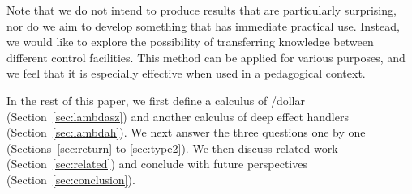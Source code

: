 Note that we do not intend to produce results that are particularly 
surprising, nor do we aim to develop something that has immediate 
practical use.
Instead, we would like to explore the possibility of transferring 
knowledge between different control facilities.
This method can be applied for various purposes, and we feel that it is 
especially effective when used in a pedagogical context.

In the rest of this paper, we first define a calculus of \shiftztt/dollar
(Section~\ref{sec:lambdasz}) and another calculus of deep effect handlers
(Section~\ref{sec:lambdah}).
We next answer the three questions one by one (Sections~\ref{sec:return} to
\ref{sec:type2}).
We then discuss related work (Section~\ref{sec:related}) and conclude
with future perspectives (Section~\ref{sec:conclusion}).
